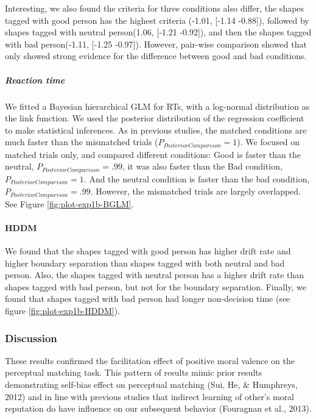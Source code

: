 \documentclass[
  english,
  man]{apa6}
\let\oldparagraph\paragraph
\renewcommand{\paragraph}[1]{\oldparagraph{#1}\mbox{}}
\let\oldsubparagraph\subparagraph
\renewcommand{\subparagraph}[1]{\oldsubparagraph{#1}\mbox{}}
\begin{document}
Interesting, we also found the criteria for three conditions also differ, the shapes tagged with good person has the highest criteria (-1.01, {[}-1.14 -0.88{]}), followed by shapes tagged with neutral person(1.06, {[}-1.21 -0.92{]}), and then the shapes tagged with bad person(-1.11, {[}-1.25 -0.97{]}). However, pair-wise comparison showed that only showed strong evidence for the difference between good and bad conditions.

\hypertarget{reaction-time}{%
\subparagraph{Reaction time}\label{reaction-time}}

We fitted a Bayesian hierarchical GLM for RTs, with a log-normal distribution as the link function. We used the posterior distribution of the regression coefficient to make statistical inferences. As in previous studies, the matched conditions are much faster than the mismatched trials (\(P_{PosteriorComparison} = 1\)). We focused on matched trials only, and compared different conditions: Good is faster than the neutral, \(P_{PosteriorComparison} = .99\), it was also faster than the Bad condition, \(P_{PosteriorComparison} = 1\). And the neutral condition is faster than the bad condition, \(P_{PosteriorComparison} = .99\). However, the mismatched trials are largely overlapped. See Figure \ref{fig:plot-exp1b-BGLM}.

\hypertarget{hddm-1}{%
\paragraph{HDDM}\label{hddm-1}}

We found that the shapes tagged with good person has higher drift rate and higher boundary separation than shapes tagged with both neutral and bad person. Also, the shapes tagged with neutral person has a higher drift rate than shapes tagged with bad person, but not for the boundary separation. Finally, we found that shapes tagged with bad person had longer non-decision time (see figure \ref{fig:plot-exp1b-HDDM}).

\hypertarget{discussion}{%
\subsubsection{Discussion}\label{discussion}}

These results confirmed the facilitation effect of positive moral valence on the perceptual matching task. This pattern of results mimic prior results demonstrating self-bias effect on perceptual matching (Sui, He, \& Humphreys, 2012) and in line with previous studies that indirect learning of other's moral reputation do have influence on our subsequent behavior (Fouragnan et al., 2013).
\end{document}
